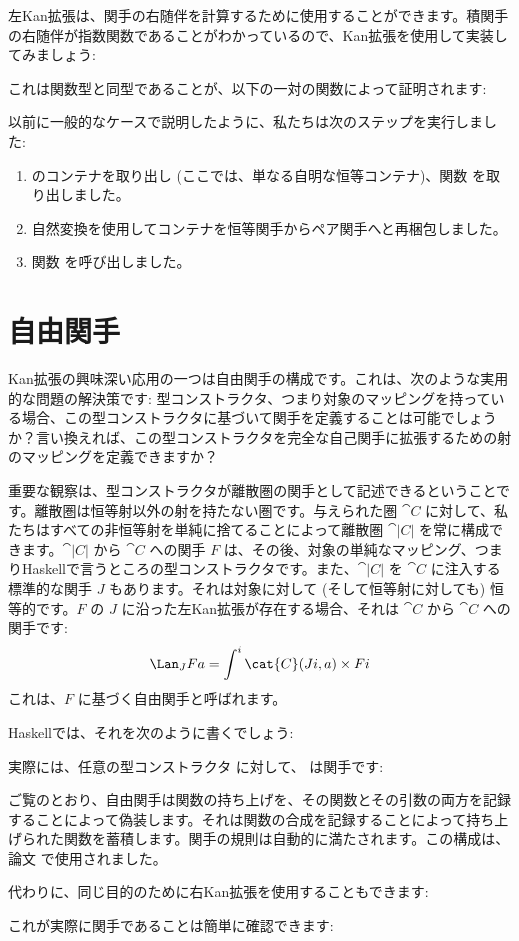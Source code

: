 左Kan拡張は、関手の右随伴を計算するために使用することができます。積関手の右随伴が指数関数であることがわかっているので、Kan拡張を使用して実装してみましょう:

これは関数型と同型であることが、以下の一対の関数によって証明されます:

以前に一般的なケースで説明したように、私たちは次のステップを実行しました:

\begin{enumerate}
  \tightlist
  \item
         のコンテナを取り出し (ここでは、単なる自明な恒等コンテナ)、関数  を取り出しました。
  \item
        自然変換を使用してコンテナを恒等関手からペア関手へと再梱包しました。
  \item
        関数  を呼び出しました。
\end{enumerate}

\section{自由関手}

Kan拡張の興味深い応用の一つは自由関手の構成です。これは、次のような実用的な問題の解決策です: 型コンストラクタ、つまり対象のマッピングを持っている場合、この型コンストラクタに基づいて関手を定義することは可能でしょうか？言い換えれば、この型コンストラクタを完全な自己関手に拡張するための射のマッピングを定義できますか？

重要な観察は、型コンストラクタが離散圏の関手として記述できるということです。離散圏は恒等射以外の射を持たない圏です。与えられた圏 $\cat{C}$ に対して、私たちはすべての非恒等射を単純に捨てることによって離散圏 $\cat{|C|}$ を常に構成できます。$\cat{|C|}$ から $\cat{C}$ への関手 $F$ は、その後、対象の単純なマッピング、つまりHaskellで言うところの型コンストラクタです。また、$\cat{|C|}$ を $\cat{C}$ に注入する標準的な関手 $J$ もあります。それは対象に対して (そして恒等射に対しても) 恒等的です。$F$ の $J$ に沿った左Kan拡張が存在する場合、それは $\cat{C}$ から $\cat{C}$ への関手です:
\[\Lan_{J}F a = \int^i \cat{C}(J i, a)\times{}F i\]
これは、$F$ に基づく自由関手と呼ばれます。

Haskellでは、それを次のように書くでしょう:

実際には、任意の型コンストラクタ  に対して、 は関手です:

ご覧のとおり、自由関手は関数の持ち上げを、その関数とその引数の両方を記録することによって偽装します。それは関数の合成を記録することによって持ち上げられた関数を蓄積します。関手の規則は自動的に満たされます。この構成は、論文  で使用されました。

代わりに、同じ目的のために右Kan拡張を使用することもできます:

これが実際に関手であることは簡単に確認できます:





